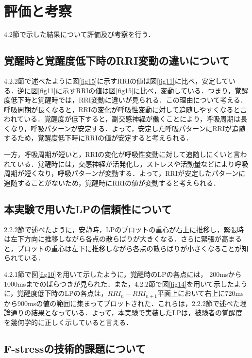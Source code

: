 \section{評価と考察}

4.2節で示した結果について評価及び考察を行う．

\subsection{覚醒時と覚醒度低下時のRRI変動の違いについて}

4.2.2節で述べたように図\ref{fig15}に示すRRIの値は図\ref{fig11}に比べ，安定している．逆に図\ref{fig11}に示すRRIの値は図\ref{fig15}に比べ，変動している．つまり，覚醒度低下時と覚醒時では，RRI変動に違いが見られる．この理由について考える．
呼吸周期が長くなると，RRIの変化が呼吸性変動に対して追随しやすくなると言われている\cite{[11]}．覚醒度が低下すると，副交感神経が働くことにより，呼吸周期は長くなり，呼吸パターンが安定する．よって，安定した呼吸パターンにRRIが追随するため，覚醒度低下時にRRIの値が安定すると考えられる．

一方，呼吸周期が短いと，RRIの変化が呼吸性変動に対して追随しにくいと言われている\cite{[11]}．覚醒時には，交感神経が活発化し，ストレスや活動量などにより呼吸周期が短くなり，呼吸パターンが変動する．よって，RRIが安定したパターンに追随することがないため，覚醒時にRRIの値が変動すると考えられる．

\subsection{本実験で用いたLPの信頼性について}

2.2.2節で述べたように，安静時，LPのプロットの重心が右上に推移し，緊張時は左下方向に推移しながら各点の散らばりが大きくなる．さらに緊張が高まると，プロットの重心は左下に推移しながら各点の散らばりが小さくなることが知られている\cite{[9]}．

4.2.1節で図\ref{fig10}を用いて示したように，覚醒時のLPの各点には， 200msから1000msまでのばらつきが見られた．また，4.2.2節で図\ref{fig14}を用いて示したように，覚醒度低下時のLPの各点は，$RRI_n-RRI_{n+1}$平面上において右上に720msから900msの値の範囲に集まってプロットされた．これらは，2.2.2節で述べた理論通りの結果となっている．よって，本実験で実装したLPは，被験者の覚醒度を幾何学的に正しく示していると言える．

\subsection{F-stressの技術的課題について}

